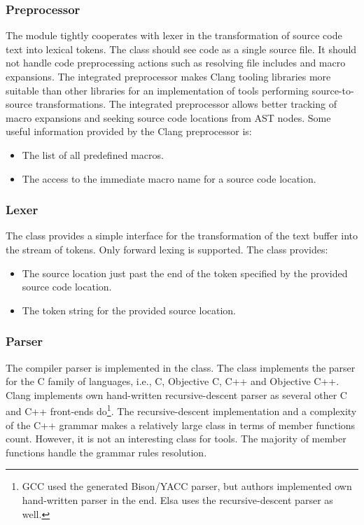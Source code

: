 \subsubsection{Preprocessor}
The  module tightly cooperates with lexer in the transformation of source code text into lexical tokens. The  class should see code as a single source file. It should not handle code preprocessing actions such as resolving file includes and macro expansions. The integrated preprocessor makes Clang tooling libraries more suitable than other libraries for an implementation of tools performing source-to-source transformations. The integrated preprocessor allows better tracking of macro expansions and seeking source code locations from AST nodes. Some useful information provided by the Clang preprocessor is:

\begin{itemize}
\item The list of all predefined macros.
\item The access to the immediate macro name for a source code location.
\end{itemize}

\subsubsection{Lexer}
The  class provides a simple interface for the transformation of the text buffer into the stream of tokens. Only forward lexing is supported. The class provides:

\begin{itemize}
\item The source location just past the end of the token specified by the provided source code location.
\item The token string for the provided source location.
\end{itemize}

\subsubsection{Parser}
The compiler parser is implemented in the  class. The class implements the parser for the C family of languages, i.e., C, Objective C, C++ and Objective C++. Clang implements own hand-written recursive-descent parser as several other C and C++ front-ends do\footnote{GCC used the generated Bison/YACC parser, but authors implemented own hand-written parser in the end. Elsa uses the recursive-descent parser as well.}. The recursive-descent implementation and a complexity of the C++ grammar makes  a relatively large class in terms of member functions count. However, it is not an interesting class for tools. The majority of member functions handle the grammar rules resolution.

